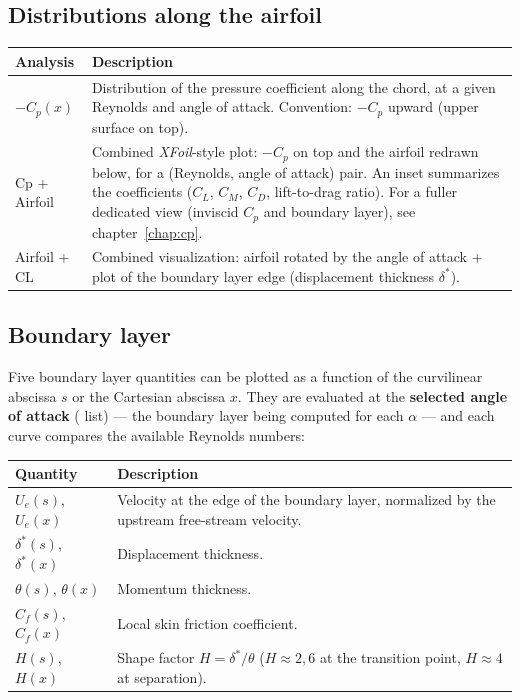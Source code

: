 \subsection{Distributions along the airfoil}

\begin{tabularx}{\linewidth}{l X}
    \toprule
    \textbf{Analysis} & \textbf{Description} \\
    \midrule
    $-C_p(x)$ & Distribution of the pressure coefficient along
               the chord, at a given Reynolds and angle of attack.
               Convention: $-C_p$ upward (upper surface on top). \\
    Cp + Airfoil & Combined \emph{XFoil}-style plot: $-C_p$ on top and
               the airfoil redrawn below, for a (Reynolds, angle of
               attack) pair. An inset summarizes the coefficients
               ($C_L$, $C_M$, $C_D$, lift-to-drag ratio). For a fuller
               dedicated view (inviscid $C_p$ and boundary layer), see
               chapter~\ref{chap:cp}. \\
    Airfoil + CL & Combined visualization: airfoil rotated by
               the angle of attack + plot of the boundary layer
               edge (displacement thickness $\delta^*$).\\
    \bottomrule
\end{tabularx}

\subsection{Boundary layer}

Five boundary layer quantities can be plotted as a function
of the curvilinear abscissa $s$ or the Cartesian abscissa $x$. They
are evaluated at the \textbf{selected angle of attack} (
list) — the boundary layer being computed for each $\alpha$ — and each
curve compares the available Reynolds numbers:

\begin{tabularx}{\linewidth}{l X}
    \toprule
    \textbf{Quantity} & \textbf{Description} \\
    \midrule
    $U_e(s)$, $U_e(x)$
        & Velocity at the edge of the boundary layer,
          normalized by the upstream free-stream velocity.\\
    $\delta^*(s)$, $\delta^*(x)$
        & Displacement thickness.\\
    $\theta(s)$, $\theta(x)$
        & Momentum thickness.\\
    $C_f(s)$, $C_f(x)$
        & Local skin friction coefficient.\\
    $H(s)$, $H(x)$
        & Shape factor $H = \delta^*/\theta$ ($H \approx 2{,}6$
          at the transition point, $H \approx 4$ at separation).\\
    \bottomrule
\end{tabularx}

